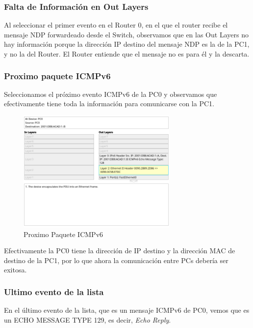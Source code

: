 \documentclass[a4paper,12pt]{article}
\begin{document}
\bigskip

\subsubsection{Falta de Información en Out Layers}

Al seleccionar el primer evento en el Router 0, en el que el router recibe el mensaje NDP forwardeado desde el Switch, observamos que en las Out Layers no hay información porque la dirección IP destino del mensaje NDP es la de la PC1, y no la del Router. El Router entiende que el mensaje no es para él y la descarta.

\bigskip

\subsubsection{Proximo paquete ICMPv6}

Seleccionamos el próximo evento ICMPv6 de la PC0 y observamos que efectivamente tiene toda la información para comunicarse con la PC1.

\bigskip
\begin{figure}[h]
  \centering
  \includegraphics[width=0.7\textwidth]{imagenes/LD2.png}
  \caption{Proximo Paquete ICMPv6}
\end{figure}
\FloatBarrier

Efectivamente la PC0 tiene la dirección de IP destino y la dirección MAC de destino de la PC1, por lo que ahora la comunicación entre PCs debería ser exitosa.

\bigskip

\subsubsection{Ultimo evento de la lista}

En el último evento de la lista, que es un mensaje ICMPv6 de PC0, vemos que es un ECHO MESSAGE TYPE 129, es decir, \textit{Echo Reply}.
\end{document}

